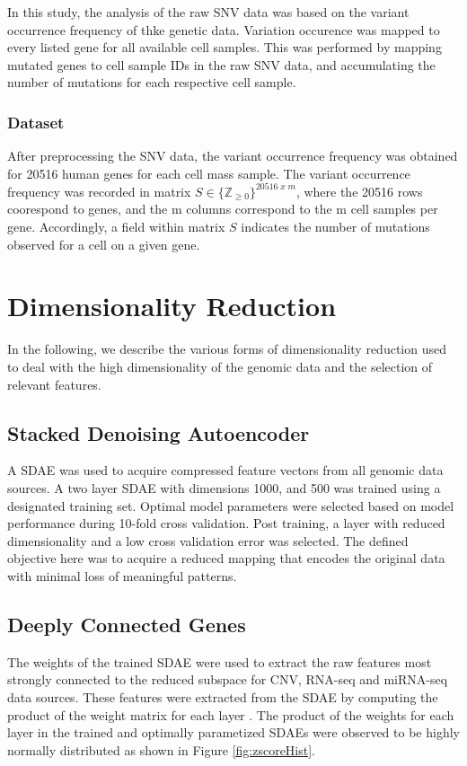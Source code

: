 
In this study, the analysis of the raw SNV data was based on the variant occurrence frequency of thke genetic data. Variation occurence was mapped to every listed gene for all available cell samples. This was performed by mapping mutated genes to cell sample IDs in the raw SNV data, and accumulating the number of mutations for each respective cell sample.

\subsubsection{Dataset}

After preprocessing the SNV data, the variant occurrence frequency was obtained for 20516 human genes for each cell mass sample. The variant occurrence frequency was recorded in matrix $S \in \{\mathbb{Z}_{\geq 0}\}^{20516 \; x \; m}$, where the 20516 rows coorespond to genes, and the m columns correspond to the m cell samples per gene. Accordingly, a field within matrix $S$ indicates the number of mutations observed for a cell on a given gene. 

\section{Dimensionality Reduction}

In the following, we describe the various forms of dimensionality reduction used to deal with the high dimensionality of the genomic data and the selection of relevant features. 

\subsection{Stacked Denoising Autoencoder}

A SDAE was used to acquire compressed feature vectors from all genomic data sources. A two layer SDAE with dimensions 1000, and 500 was trained using a designated training set. Optimal model parameters were selected based on model performance during 10-fold cross validation. Post training, a layer with reduced dimensionality and a low cross validation error was selected. The defined objective here was to acquire a reduced mapping that encodes the original data with minimal loss of meaningful patterns.

\subsection{Deeply Connected Genes}
The weights of the trained SDAE were used to extract the raw features most strongly connected to the reduced subspace for CNV, RNA-seq and miRNA-seq data sources. These features were extracted from the SDAE by computing the product of the weight matrix for each layer \cite{danaee2017deep}. 
The product of the weights for each layer in the trained and optimally parametized SDAEs were observed to be highly normally distributed as shown in Figure \ref{fig:zscoreHist}. 

